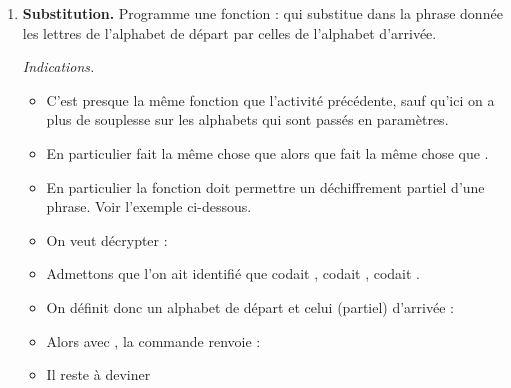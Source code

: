 \documentclass[11pt,class=report,crop=false]{standalone}
\begin{document}
\begin{activite}



\begin{enumerate}
  \item \textbf{Substitution.} Programme une fonction :  
  qui substitue dans la phrase donnée les lettres de l'alphabet de départ par celles de l'alphabet d'arrivée.

  \emph{Indications.}
  \begin{itemize}
    \item C'est presque la même fonction que l'activité précédente, sauf qu'ici on a plus de souplesse sur les alphabets qui sont passés en paramètres.
    
    \item En particulier  fait la même chose que  alors que 
  fait la même chose que .
 
   \item En particulier la fonction  doit permettre un déchiffrement partiel d'une phrase. Voir l'exemple ci-dessous.
  \end{itemize}
  
 
  \begin{exemple}
  \sauteligne
  \begin{itemize}
    \item On veut décrypter :
  \item Admettons que l'on ait identifié que 
   codait ,  codait ,  codait .
  \item On définit donc un alphabet de départ et celui (partiel) d'arrivée : 

  \item Alors avec , la commande 
   renvoie :  
 \item Il reste à deviner 
  \end{itemize}
  \end{exemple}


\end{enumerate}
\end{activite}
\end{document}
